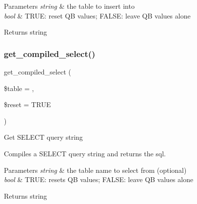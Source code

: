 \begin{DoxyParams}{Parameters}
{\em string} & the table to insert into \\
\hline
{\em bool} & T\+R\+UE\+: reset QB values; F\+A\+L\+SE\+: leave QB values alone \\
\hline
\end{DoxyParams}
\begin{DoxyReturn}{Returns}
string 
\end{DoxyReturn}
\mbox{\label{class_c_i___d_b__query__builder_a23325dd8908b76e716e430b4968e3987}} 
\subsubsection{\texorpdfstring{get\+\_\+compiled\+\_\+select()}{get\_compiled\_select()}}
{\footnotesize\ttfamily get\+\_\+compiled\+\_\+select (\begin{DoxyParamCaption}\item[{}]{\$table = {\ttfamily \textquotesingle{}\textquotesingle{}},  }\item[{}]{\$reset = {\ttfamily TRUE} }\end{DoxyParamCaption})}

Get S\+E\+L\+E\+CT query string

Compiles a S\+E\+L\+E\+CT query string and returns the sql.


\begin{DoxyParams}{Parameters}
{\em string} & the table name to select from (optional) \\
\hline
{\em bool} & T\+R\+UE\+: resets QB values; F\+A\+L\+SE\+: leave QB values alone \\
\hline
\end{DoxyParams}
\begin{DoxyReturn}{Returns}
string 
\end{DoxyReturn}
\mbox{\label{class_c_i___d_b__query__builder_a77fb150224714405067df7c300c317b0}} 
